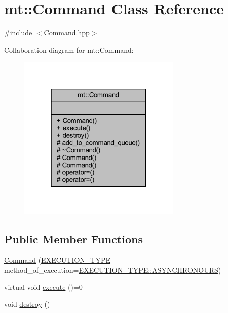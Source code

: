 \hypertarget{classmt_1_1_command}{}\section{mt\+:\+:Command Class Reference}
\label{classmt_1_1_command}


{\ttfamily \#include $<$Command.\+hpp$>$}



Collaboration diagram for mt\+:\+:Command\+:\nopagebreak
\begin{figure}[H]
\begin{center}
\leavevmode
\includegraphics[width=220pt]{classmt_1_1_command__coll__graph}
\end{center}
\end{figure}
\subsection*{Public Member Functions}
\begin{DoxyCompactItemize}
\item 
\hyperlink{classmt_1_1_command_a308677a73eaa06f6e88ba15feb9f6cc9_a308677a73eaa06f6e88ba15feb9f6cc9}{Command} (\hyperlink{namespacemt_afb9453c305235c568158294078a7c5f3_afb9453c305235c568158294078a7c5f3}{E\+X\+E\+C\+U\+T\+I\+O\+N\+\_\+\+T\+Y\+PE} method\+\_\+of\+\_\+execution=\hyperlink{namespacemt_afb9453c305235c568158294078a7c5f3_afb9453c305235c568158294078a7c5f3a50e2d0c1a6b6eea4ea4774ab8204d6f5}{E\+X\+E\+C\+U\+T\+I\+O\+N\+\_\+\+T\+Y\+P\+E\+::\+A\+S\+Y\+N\+C\+H\+R\+O\+N\+O\+U\+RS})
\item 
virtual void \hyperlink{classmt_1_1_command_a87ca295c64ed47ce9ac20e7d169e2c46_a87ca295c64ed47ce9ac20e7d169e2c46}{execute} ()=0
\item 
void \hyperlink{classmt_1_1_command_a5625b52e727c98c027b39a7bcf38ac27_a5625b52e727c98c027b39a7bcf38ac27}{destroy} ()
\end{DoxyCompactItemize}
